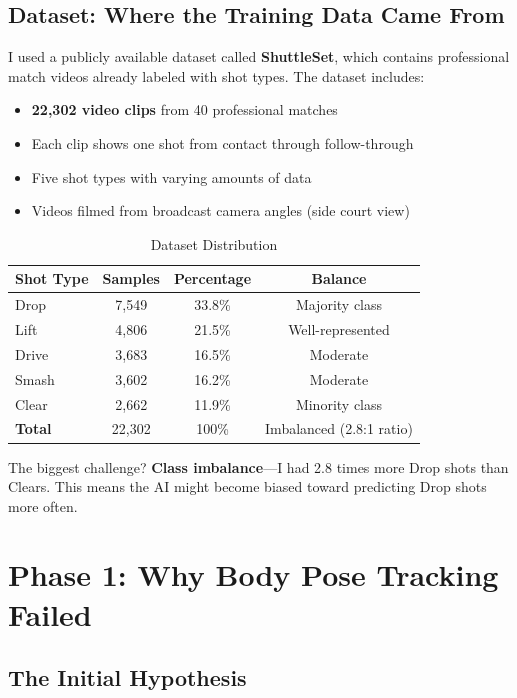 \documentclass[11pt,a4paper]{article}
\begin{document}
\subsection{Dataset: Where the Training Data Came From}

I used a publicly available dataset called \textbf{ShuttleSet}, which contains professional match videos already labeled with shot types. The dataset includes:

\begin{itemize}
\item \textbf{22,302 video clips} from 40 professional matches
\item Each clip shows one shot from contact through follow-through
\item Five shot types with varying amounts of data
\item Videos filmed from broadcast camera angles (side court view)
\end{itemize}

\begin{table}[H]
\centering
\caption{Dataset Distribution}
\begin{tabular}{lccc}
\toprule
\textbf{Shot Type} & \textbf{Samples} & \textbf{Percentage} & \textbf{Balance} \\
\midrule
Drop & 7,549 & 33.8\% & Majority class \\
Lift & 4,806 & 21.5\% & Well-represented \\
Drive & 3,683 & 16.5\% & Moderate \\
Smash & 3,602 & 16.2\% & Moderate \\
Clear & 2,662 & 11.9\% & Minority class \\
\midrule
\textbf{Total} & 22,302 & 100\% & Imbalanced (2.8:1 ratio) \\
\bottomrule
\end{tabular}
\end{table}

The biggest challenge? \textbf{Class imbalance}---I had 2.8 times more Drop shots than Clears. This means the AI might become biased toward predicting Drop shots more often.

\section{Phase 1: Why Body Pose Tracking Failed}

\subsection{The Initial Hypothesis}
\end{document}
